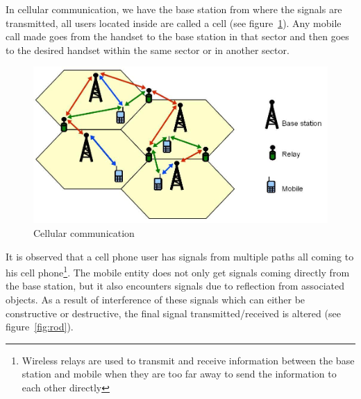 In cellular communication, we have the base station from where the signals are transmitted, all users located inside are called a cell (see figure~\ref{fig:rrsadafig1}). Any mobile call made goes from the handset to the base station in that sector and then goes to the desired handset within the same sector or in another sector.
\begin{figure}[h]
\centering
\includegraphics[scale=0.3]{./graphics/RR_sada_fig1}
\caption{Cellular communication}
\label{fig:rrsadafig1}
\end{figure}

It is observed that a cell phone user has signals from multiple paths all coming to his cell phone\footnote{Wireless relays are used to transmit and receive information between the base station and mobile when they are too far away to send the information to each other directly}. The mobile entity does not only get signals coming directly from the base station, but it also encounters signals due to reflection from associated objects. As a result of interference of these signals which can either be constructive or destructive, the final signal transmitted/received is altered (see figure~\ref{fig:rod}). 

